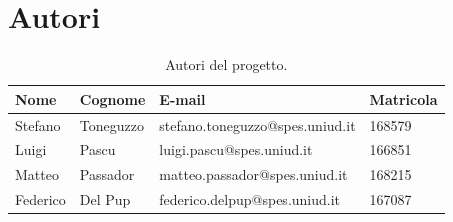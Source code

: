 \documentclass[a4paper,12pt]{article}
\begin{document}
\section{Autori}
\begin{table}[htbp]
\centering
\small
\caption{Autori del progetto.}
\label{tab:autori}
\begin{tabularx}{\textwidth}{X X l X}
\toprule
\textbf{Nome} & \textbf{Cognome} & \textbf{E-mail} & \textbf{Matricola} \\ 
\midrule
Stefano & Toneguzzo & stefano.toneguzzo@spes.uniud.it & 168579 \\ 
\midrule
Luigi & Pascu & luigi.pascu@spes.uniud.it & 166851 \\ 
\midrule
Matteo & Passador & matteo.passador@spes.uniud.it & 168215 \\
\midrule 
Federico & Del Pup & federico.delpup@spes.uniud.it & 167087 \\ 
\bottomrule
\end{tabularx}
\end{table}
\end{document}
